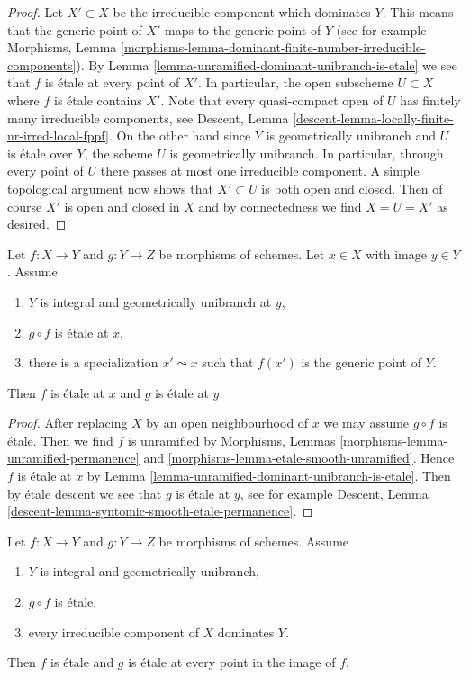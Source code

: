 \begin{proof}
Let $X' \subset X$ be the irreducible component which dominates $Y$.
This means that the generic point of $X'$ maps to the generic point of $Y$
(see for example Morphisms, Lemma
\ref{morphisms-lemma-dominant-finite-number-irreducible-components}).
By Lemma \ref{lemma-unramified-dominant-unibranch-is-etale}
we see that $f$ is \'etale at every point of $X'$. In particular,
the open subscheme $U \subset X$ where $f$ is \'etale contains $X'$.
Note that every quasi-compact open of $U$ has finitely many irreducible
components, see
Descent, Lemma \ref{descent-lemma-locally-finite-nr-irred-local-fppf}.
On the other hand since $Y$ is geometrically unibranch and $U$ is \'etale
over $Y$, the scheme $U$ is geometrically unibranch. In particular, through
every point of $U$ there passes at most one irreducible component.
A simple topological argument now shows that $X' \subset U$
is both open and closed. Then of course $X'$ is open and closed in $X$ and by
connectedness we find $X = U = X'$ as desired.
\end{proof}

\begin{lemma}
\label{lemma-weird-permanence-etale}
Let $f : X \to Y$ and $g : Y \to Z$ be morphisms of schemes.
Let $x \in X$ with image $y \in Y$. Assume
\begin{enumerate}
\item $Y$ is integral and geometrically unibranch at $y$,
\item $g \circ f$ is \'etale at $x$,
\item there is a specialization $x' \leadsto x$ such that $f(x')$
is the generic point of $Y$.
\end{enumerate}
Then $f$ is \'etale at $x$ and $g$ is \'etale at $y$.
\end{lemma}

\begin{proof}
After replacing $X$ by an open neighbourhood of $x$
we may assume $g \circ f$ is \'etale.
Then we find $f$ is unramified by Morphisms, Lemmas
\ref{morphisms-lemma-unramified-permanence}
and \ref{morphisms-lemma-etale-smooth-unramified}.
Hence $f$ is \'etale at $x$ by
Lemma \ref{lemma-unramified-dominant-unibranch-is-etale}.
Then by \'etale descent we see that $g$ is \'etale at $y$, see
for example Descent, Lemma
\ref{descent-lemma-syntomic-smooth-etale-permanence}.
\end{proof}

\begin{lemma}
\label{lemma-global-weird-permanence-etale}
Let $f : X \to Y$ and $g : Y \to Z$ be morphisms of schemes.
Assume
\begin{enumerate}
\item $Y$ is integral and geometrically unibranch,
\item $g \circ f$ is \'etale,
\item every irreducible component of $X$ dominates $Y$.
\end{enumerate}
Then $f$ is \'etale and $g$ is \'etale at every point in
the image of $f$.
\end{lemma}

